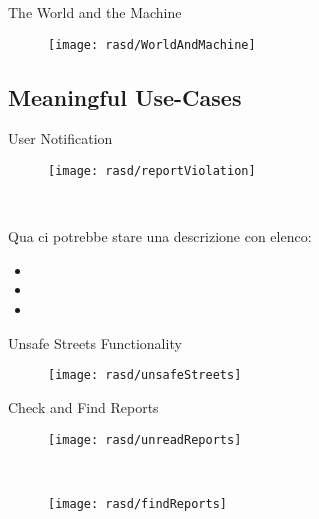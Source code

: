 		\begin{frame}{The World and the Machine}
			\vspace{-24pt}
			\begin{figure}[hbtp]
				\centering
				\texttt{[image: rasd/WorldAndMachine]}
			\end{figure}
		\end{frame}
	
	\subsection{Meaningful Use-Cases}
		\begin{frame}{User Notification}
				\begin{minipage}{0.4\textwidth}
					\begin{flushleft}
						\begin{figure}[ht]
							\centering
							\texttt{[image: rasd/reportViolation]}
						\end{figure}
					\end{flushleft}
				\end{minipage}\hfill
				~
				\begin{minipage}{0.43\textwidth}\small
					Qua ci potrebbe stare una descrizione con elenco:
					\begin{itemize}
						\item 
						\item 
						\item 
					\end{itemize}
				\end{minipage}
		\end{frame}
	
		\begin{frame}{Unsafe Streets Functionality}
			\begin{figure}[hbtp]
				\centering
				\texttt{[image: rasd/unsafeStreets]}
			\end{figure}
		\end{frame}
	
		\begin{frame}{Check and Find Reports}
			\begin{minipage}{0.4\textwidth}
				\begin{figure}
					\centering
					\texttt{[image: rasd/unreadReports]}
				\end{figure}
			\end{minipage}\hfill
			~
			\begin{minipage}{0.4\textwidth}
				\begin{figure}
					\centering
					\texttt{[image: rasd/findReports]}
				\end{figure}
			\end{minipage}
			
		\end{frame}
